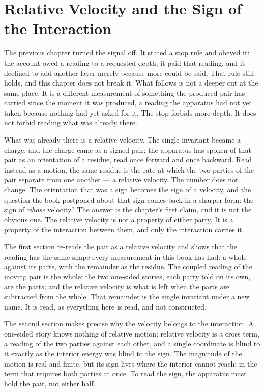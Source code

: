 \chapter{Relative Velocity and the Sign of the Interaction}

The previous chapter turned the signal off. It stated a stop rule and obeyed it: the
account owed a reading to a requested depth, it paid that reading, and it declined to
add another layer merely because more could be said. That rule still holds, and this
chapter does not break it. What follows is not a deeper cut at the same place. It is a
different measurement of something the produced pair has carried since the moment it
was produced, a reading the apparatus had not yet taken because nothing had yet asked
for it. The stop forbids more depth. It does not forbid reading what was already there.

What was already there is a relative velocity. The single invariant became a charge, and
the charge came as a signed pair; the apparatus has spoken of that pair as an orientation
of a residue, read once forward and once backward. Read instead as a motion, the same
residue is the rate at which the two parties of the pair separate from one another --- a
relative velocity. The number does not change. The orientation that was a sign becomes the
sign of a velocity, and the question the book postponed about that sign comes back in a
sharper form: the sign of \emph{whose} velocity? The answer is the chapter's first claim,
and it is not the obvious one. The relative velocity is not a property of either party. It
is a property of the interaction between them, and only the interaction carries it.

The first section re-reads the pair as a relative velocity and shows that the reading has
the same shape every measurement in this book has had: a whole against its parts, with the
remainder as the residue. The coupled reading of the moving pair is the whole; the two
one-sided stories, each party told on its own, are the parts; and the relative velocity is
what is left when the parts are subtracted from the whole. That remainder is the single
invariant under a new name. It is read, as everything here is read, and not constructed.

The second section makes precise why the velocity belongs to the interaction. A
one-sided story knows nothing of relative motion; relative velocity is a cross term, a
reading of the two parties against each other, and a single coordinate is blind to it
exactly as the interior energy was blind to the sign. The magnitude of the motion is real
and finite, but its sign lives where the interior cannot reach: in the term that requires
both parties at once. To read the sign, the apparatus must hold the pair, not either half.

